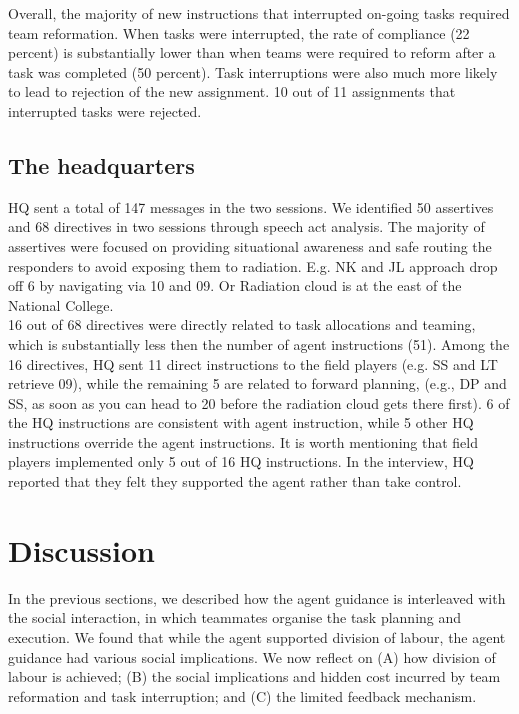 Overall, the majority of new instructions that interrupted on-going tasks required team reformation. When tasks were interrupted, the rate of compliance (22 percent) is substantially lower than when teams were required to reform after a task was completed (50 percent). Task interruptions were also much more likely to lead to rejection of the new assignment. 10 out of 11 assignments that interrupted tasks were rejected.\\

\subsection{The headquarters}

HQ sent a total of 147 messages in the two sessions. We identified 50 assertives and 68 directives in two sessions through speech act analysis. The majority of assertives were focused on providing situational awareness and safe routing the responders to avoid exposing them to radiation. E.g. NK and JL approach drop off 6 by navigating via 10 and 09. Or Radiation cloud is at the east of the National College.\\

16 out of 68 directives were directly related to task allocations and teaming, which is substantially less then the number of agent instructions (51). Among the 16 directives, HQ sent 11 direct instructions to the field players (e.g. SS and LT retrieve 09), while the remaining 5 are related to forward planning, (e.g., DP and SS, as soon as you can head to 20 before the radiation cloud gets there first). 6 of the HQ instructions are consistent with agent instruction, while 5 other HQ instructions override the agent instructions. It is worth mentioning that field players implemented only 5 out of 16 HQ instructions. In the interview, HQ reported that they felt they supported the agent rather than take control. 

\section{Discussion}
In the previous sections, we described how the agent guidance is interleaved with the social interaction, in which teammates organise the task planning and execution. We found that while the agent supported division of labour, the agent guidance had various social implications. We now reflect on (A) how division of labour is achieved; (B) the social implications and hidden cost incurred by team reformation and task interruption; and (C) the limited feedback mechanism. \\


